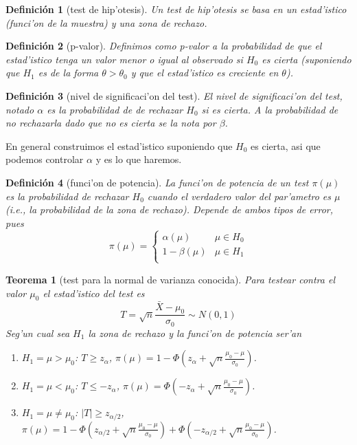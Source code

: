 \documentclass[a4paper,spanish]{article}
\newtheorem{teo}{Teorema}
\newtheorem{defi}{Definici\'on}
\begin{document}
\begin{defi}[test de hip'otesis]
Un \emph{test de hip'otesis} se basa en un estad'istico (funci'on de la
muestra) y una zona de rechazo.
\end{defi}

\begin{defi}[p-valor]
Definimos como p-valor a la probabilidad de que el estad'istico tenga un valor
menor o igual al observado si $H_0$ es cierta (suponiendo que $H_1$ es de la
forma $\theta > \theta_0$ y que el estad'istico es creciente en $\theta$).
\end{defi}

\begin{defi}[nivel de significaci'on del test]
El \emph{nivel de significaci'on del test}, notado $\alpha$ es la probabilidad
de de rechazar $H_0$ si es cierta. A la probabilidad de no rechazarla dado que
no es cierta se la nota por $\beta$.
\end{defi}
En general construimos el estad'istico suponiendo que $H_0$ es cierta, asi que
podemos controlar $\alpha$ y es lo que haremos.

\begin{defi}[funci'on de potencia]
La \emph{funci'on de potencia} de un test $\pi(\mu)$ es la 
probabilidad de rechazar $H_0$ cuando el verdadero valor del par'ametro es
$\mu$ (i.e., la probabilidad de la zona de rechazo). Depende de ambos tipos de 
error, pues
$$\pi(\mu) =
	\begin{cases}
		\alpha(\mu) & \mu \in H_0 \\
		1-\beta(\mu) & \mu \in H_1 \\
	\end{cases}$$
\end{defi}

\begin{teo}[test para la normal de varianza conocida]
Para testear contra el valor $\mu_0$ el estad'istico del test es
$$T = \sqrt{n} \frac{\bar{X}-\mu_0}{\sigma_0} \sim N(0,1)$$
Seg'un cual sea $H_1$ la zona de rechazo y la funci'on de potencia ser'an
\begin{enumerate} 
\item $H_1 = \mu > \mu_0$: $T \geq z_\alpha$, 
$\displaystyle \pi(\mu) = 
	1-\Phi\left(z_\alpha+\sqrt{n}\frac{\mu_0-\mu}{\sigma_0}\right)$.
\item $H_1 = \mu < \mu_0$: $T \leq -z_\alpha$,
$\displaystyle \pi(\mu) = 
	\Phi\left(-z_\alpha+\sqrt{n}\frac{\mu_0-\mu}{\sigma_0}\right)$.
\item $H_1 = \mu \neq \mu_0$: $|T| \geq z_{\alpha/2}$, 
$\displaystyle \pi(\mu) = 
	1-\Phi\left(z_{\alpha/2}+\sqrt{n}\frac{\mu_0-\mu}{\sigma_0}\right)
	 +\Phi\left(-z_{\alpha/2}+\sqrt{n}\frac{\mu_0-\mu}{\sigma_0}\right)$.
\end{enumerate}
\end{teo}
\end{document}
